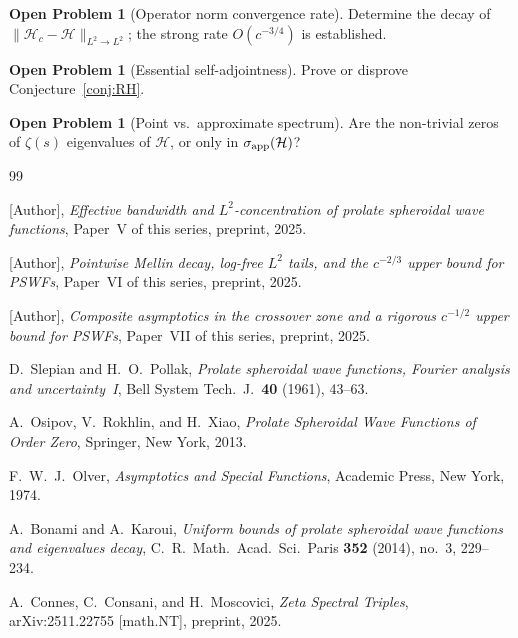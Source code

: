 \documentclass[12pt,a4paper]{amsart}
\theoremstyle{definition}
\newtheorem{problem}[theorem]{Open Problem}
\theoremstyle{remark}
\newcommand{\Hc}{\mathcal{H}_c}
\newcommand{\Hlim}{\mathcal{H}}
\begin{document}
\begin{problem}[Operator norm convergence rate]
Determine the decay of $\|\Hc-\Hlim\|_{L^2\to L^2}$;
the strong rate $O(c^{-3/4})$ is established.
\end{problem}

\begin{problem}[Essential self-adjointness]
Prove or disprove Conjecture~\ref{conj:RH}.
\end{problem}

\begin{problem}[Point vs.\ approximate spectrum]
Are the non-trivial zeros of $\zeta(s)$
eigenvalues of $\Hlim$, or only in
$\sigma_{\rm app}(\Hlim)$?
\end{problem}

\begin{thebibliography}{99}

[Author],
\textit{Effective bandwidth and $L^2$-concentration
of prolate spheroidal wave functions},
Paper~V of this series, preprint, 2025.

[Author],
\textit{Pointwise Mellin decay, log-free $L^2$ tails,
and the $c^{-2/3}$ upper bound for PSWFs},
Paper~VI of this series, preprint, 2025.

[Author],
\textit{Composite asymptotics in the crossover zone
and a rigorous $c^{-1/2}$ upper bound for PSWFs},
Paper~VII of this series, preprint, 2025.

D.~Slepian and H.~O.~Pollak,
\textit{Prolate spheroidal wave functions,
Fourier analysis and uncertainty~I},
Bell System Tech.\ J.\ \textbf{40} (1961), 43--63.

A.~Osipov, V.~Rokhlin, and H.~Xiao,
\textit{Prolate Spheroidal Wave Functions of Order Zero},
Springer, New York, 2013.

F.~W.~J.~Olver,
\textit{Asymptotics and Special Functions},
Academic Press, New York, 1974.

A.~Bonami and A.~Karoui,
\textit{Uniform bounds of prolate spheroidal wave
functions and eigenvalues decay},
C.\ R.\ Math.\ Acad.\ Sci.\ Paris \textbf{352} (2014),
 no.~3, 229--234.

A.~Connes, C.~Consani, and H.~Moscovici,
\textit{Zeta Spectral Triples},
arXiv:2511.22755 [math.NT], preprint, 2025.

\end{thebibliography}
\end{document}

